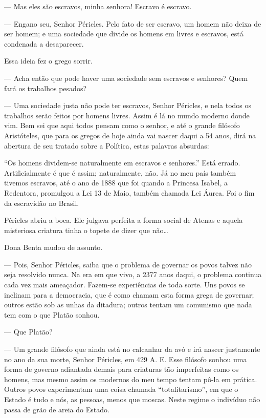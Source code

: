 --- Mas eles são escravos, minha senhora! Escravo é escravo.

--- Engano seu, Senhor Péricles. Pelo fato de ser escravo, um homem não
deixa de ser homem; e uma sociedade que divide os homens em livres e
escravos, está condenada a desaparecer.

Essa ideia fez o grego sorrir.

--- Acha então que pode haver uma sociedade sem escravos e senhores?
Quem fará os trabalhos pesados?

--- Uma sociedade justa não pode ter escravos, Senhor Péricles, e nela
todos os trabalhos serão feitos por homens livres. Assim é lá no mundo
moderno donde vim. Bem sei que aqui todos pensam como o senhor, e até o
grande filósofo Aristóteles, que para os gregos de hoje ainda vai nascer
daqui a 54 anos, dirá na abertura de seu tratado sobre a Política, estas
palavras absurdas:

``Os homens dividem-se naturalmente em escravos e senhores.'' Está
errado. Artificialmente é que é assim; naturalmente, não. Já no meu país
também tivemos escravos, até o ano de 1888 que foi quando a Princesa
Isabel, a Redentora, promulgou a Lei 13 de Maio, também chamada Lei
Áurea. Foi o fim da escravidão no Brasil.

Péricles abriu a boca. Ele julgava perfeita a forma social de Atenas e
aquela misteriosa criatura tinha o topete de dizer que não\ldots{}

Dona Benta mudou de assunto.

--- Pois, Senhor Péricles, saiba que o problema de governar os povos
talvez não seja resolvido nunca. Na era em que vivo, a 2377 anos daqui,
o problema continua cada vez mais ameaçador. Fazem-se experiências de
toda sorte. Uns povos se inclinam para a democracia, que é como chamam
esta forma grega de governar; outros estão sob as unhas da ditadura;
outros tentam um comunismo que nada tem com o que Platão sonhou.

--- Que Platão?

--- Um grande filósofo que ainda está no calcanhar da avó e irá nascer
justamente no ano da sua morte, Senhor Péricles, em 429 A. E. Esse
filósofo sonhou uma forma de governo adiantada demais para criaturas tão
imperfeitas como os homens, mas mesmo assim os modernos do meu tempo
tentam pô-la em prática. Outros povos experimentam uma coisa chamada
``totalitarismo'', em que o Estado é tudo e nós, as pessoas, menos que
moscas. Neste regime o indivíduo não passa de grão de areia do Estado.

